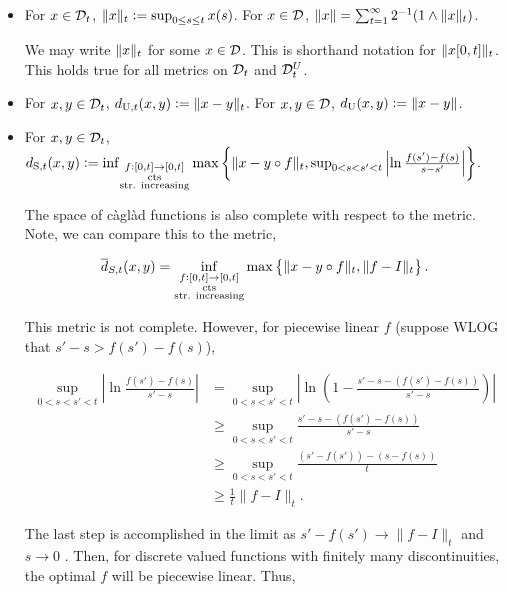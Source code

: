 \begin{itemize}
\item For \(x \in \mathcal{D}_{t}\), \(\|x\|_{t} := \sup_{0\leq s \leq t} x(s)\). For \(x \in \mathcal{D}\), \(\|x\| = \sum_{t=1}^\infty 2^{-1}(1\wedge \|x\|_{t})\).

\skipLine

\remark We may write \(\|x\|_t\) for some \(x \in \mathcal{D}\). This is shorthand notation for \(\|x[0,t]\|_t\). This holds true for all metrics on \(\mathcal{D}_{t}\) and \(\mathcal{D}^{U}_{t}\).

\skipLine 

\item For \(x,y \in \mathcal{D}_{t}\), \(\utmet{t}(\xf,\xg) \defeq \|\xf-\xg\|\tpara{t}\). For \(x,y \in \mathcal{D}\), \(\utmet{}(\xf,\xg) \defeq \|\xf - \xg\|\).

\item For \(x,y \in \mathcal{D}_{t}\), \(\stmet{t}(\xf,\xg)  \defeq \inf_{\substack{f:[0,t]\ra[0,t]\\\te{cts}\\\te{str. increasing}}}\max\left\{\|\xf-\xg\circ f\|\tpara{t},\sup_{0<s<s'<t}\left|\ln \frac{f(s') -f(s)}{s-s'}\right|\right\}\).

The space of c\`agl\`ad functions is also complete with respect to the metric. Note, we can compare this to the metric,

\[\overline{d}_{S,t}(x,y) = \inf_{\substack{f:[0,t]\rightarrow [0,t]\\\text{cts}\\\text{str. increasing}}} \max\left\{\|x - y\circ f\|_t,\|f - I\|_t\right\}.\]

This metric is not complete. However, for piecewise linear \(f\) (suppose WLOG that \(s'-s > f(s')-f(s)\)),

\begin{align*}
\sup_{0 < s < s' < t}\left|\ln\frac{f(s') - f(s)}{s'-s}\right| &=\sup_{0 < s < s' < t}\left|\ln\left(1 - \frac{s' - s - (f(s') - f(s))}{s'-s}\right)\right|\\
&\geq \sup_{0 < s < s' < t}\frac{s'-s-(f(s')-f(s))}{s'-s}\\
&\geq \sup_{0 < s < s' < t} \frac{(s'-f(s')) - (s - f(s))}{t}\\
&\geq \frac{1}{t}\|f - I\|_t.
\end{align*}

The last step is accomplished in the limit as \(s' - f(s') \rightarrow \|f - I\|_t\) and \(s \rightarrow 0\) . Then, for discrete valued functions with finitely many discontinuities, the optimal \(f\) will be piecewise linear. Thus, 


\end{itemize}
